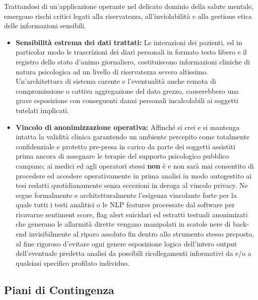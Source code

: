 Trattandosi di un'applicazione operante nel delicato dominio della salute mentale, emergono rischi critici legati alla riservatezza, all'inviolabilità e alla gestione etica delle informazioni sensibili.

\begin{itemize}
    \item \textbf{Sensibilità estrema dei dati trattati:} Le interazioni dei pazienti, ed in particolar modo le trascrizioni dei diari personali in formato testo libero e il registro dello stato d'animo giornaliero, costituiscono informazioni cliniche di natura psicologica ad un livello di riservatezza severo altissimo. Un'architettura di sistema carente e l'eventualità anche remota di compromissione o cattiva aggregazione del dato grezzo, causerebbero una grave esposizione con conseguenti danni personali incalcolabili ai soggetti tutelati implicati.
    \item \textbf{Vincolo di anonimizzazione operativa:} Affinché si crei e si mantenga intatta la validità clinica garantendo un ambiente percepito come totalmente confidenziale e protetto pre-presa in carico da parte dei soggetti assistiti prima ancora di assegnare le terapie del supporto psicologico pubblico campano; ai medici ed agli operatori stessi \textbf{non} è e non sarà mai consentito di procedere ed accedere operativamente in prima analisi in modo autogestito ai tesi redatti quotidianamente senza eccezioni in deroga al vincolo privacy. Ne segue formalmente e architetturalmente l'esigenza vincolante forte per la quale tutti i testi analitici o le NLP features processate dal software per ricavarne sentiment score, flag alert suicidari ed estratti testuali anonimizati che generano le allarmità dirette vengano manipolati in scatole nere di back-end invisibilmente al riparo assoluto fin dentro allo strumento stesso preposto, al fine rigoroso d'evitare ogni genere esposizione logica dell'intero output dell'eventuale predetta analisi da possibili ricollegamenti informativi da e/o a qualsiasi specifico profilato individuo.
\end{itemize}

\subsection*{Piani di Contingenza}

